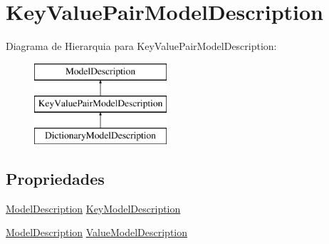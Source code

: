 \hypertarget{classApi3Layers_1_1Areas_1_1HelpPage_1_1ModelDescriptions_1_1KeyValuePairModelDescription}{}\section{Key\+Value\+Pair\+Model\+Description}
\label{classApi3Layers_1_1Areas_1_1HelpPage_1_1ModelDescriptions_1_1KeyValuePairModelDescription}
Diagrama de Hierarquia para Key\+Value\+Pair\+Model\+Description\+:\begin{figure}[H]
\begin{center}
\leavevmode
\includegraphics[height=3.000000cm]{classApi3Layers_1_1Areas_1_1HelpPage_1_1ModelDescriptions_1_1KeyValuePairModelDescription}
\end{center}
\end{figure}
\subsection*{Propriedades}
\begin{DoxyCompactItemize}
\item 
\hyperlink{classApi3Layers_1_1Areas_1_1HelpPage_1_1ModelDescriptions_1_1ModelDescription}{Model\+Description} \hyperlink{classApi3Layers_1_1Areas_1_1HelpPage_1_1ModelDescriptions_1_1KeyValuePairModelDescription_a007c899d0967cadd0ba3dd3401b835ea}{Key\+Model\+Description}
\item 
\hyperlink{classApi3Layers_1_1Areas_1_1HelpPage_1_1ModelDescriptions_1_1ModelDescription}{Model\+Description} \hyperlink{classApi3Layers_1_1Areas_1_1HelpPage_1_1ModelDescriptions_1_1KeyValuePairModelDescription_aa80f5630d332a9c35eea5c0f793574e5}{Value\+Model\+Description}
\end{DoxyCompactItemize}


